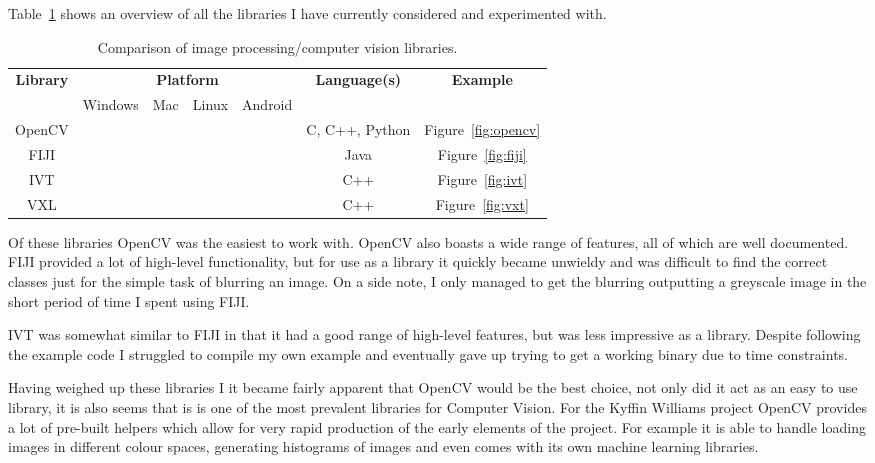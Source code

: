 \documentclass[11pt,fleqn,twoside]{article}
\begin{document}
Table~\ref{tab:libraries-overview} shows an overview of all the libraries I have currently 
considered and experimented with.

\begin{table}[h]
\begin{tabular}{| c | c | c | c | c | c | c |}
								  \hline
\multirow{2}{*}{\textbf{Library}}	& \multicolumn{4}{|c|}{\textbf{Platform}}			& \multirow{2}{*}{\textbf{Language(s)}}	& \textbf{Example}	\\\cline{2-5}
					&  Windows	& Mac 		& Linux 	& Android	&					&			\\\hline
OpenCV					& \checkmark	& \checkmark	& \checkmark	& \checkmark	& C, C++, Python			& Figure~\ref{fig:opencv}\\\hline
FIJI					& \checkmark	& \checkmark	& \checkmark	& 		& Java					& Figure~\ref{fig:fiji}	\\\hline
IVT					& \checkmark	& \checkmark	& \checkmark	& 		& C++					& Figure~\ref{fig:ivt}	\\\hline
VXL					& \checkmark	& \checkmark	& \checkmark	& 		& C++					& Figure~\ref{fig:vxt}	\\\hline
\end{tabular}
\caption{Comparison of image processing/computer vision libraries.}
\label{tab:libraries-overview}
\end{table}

Of these libraries OpenCV was the easiest to work with. OpenCV also boasts a wide range of 
features, all of which are well documented. FIJI provided a lot of high-level functionality, but
for use as a library it quickly became unwieldy and was difficult to find the correct classes just 
for the simple task of blurring an image. On a side note, I only managed to get the blurring 
outputting a greyscale image in the short period of time I spent using FIJI.

IVT was somewhat similar to FIJI in that it had a good range of high-level features, but was less
impressive as a library. Despite following the example code I struggled to compile my own example
and eventually gave up trying to get a working binary due to time constraints.


Having weighed up these libraries I it became fairly apparent that OpenCV would be the best choice,
not only did it act as an easy to use library, it is also seems that is is one of the most 
prevalent libraries for Computer Vision. For the Kyffin Williams project OpenCV provides a lot of
pre-built helpers which allow for very rapid production of the early elements of the project. For
example it is able to handle loading images in different colour spaces, generating histograms of
images and even comes with its own machine learning libraries.
\end{document}
